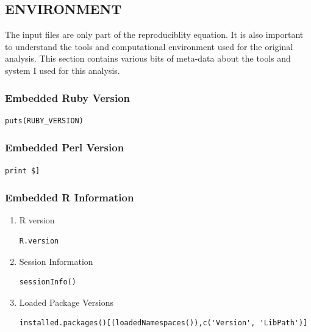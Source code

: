 \documentclass[11pt]{article}
\begin{document}
\subsection{ENVIRONMENT}
\label{sec-9-2}

The input files are only part of the reproduciblity equation.  It is also important to understand the tools and computational environment used for the
original analysis.  This section contains various bits of meta-data about the tools and system I used for this analysis.

\subsubsection{Embedded Ruby Version}
\label{sec-9-2-1}

\begin{verbatim}
puts(RUBY_VERSION)
\end{verbatim}

\subsubsection{Embedded Perl Version}
\label{sec-9-2-2}

\begin{verbatim}
print $]
\end{verbatim}

\subsubsection{Embedded R Information}
\label{sec-9-2-3}

\begin{enumerate}
\item R version
\label{sec-9-2-3-1}

\begin{verbatim}
R.version
\end{verbatim}

\item Session Information
\label{sec-9-2-3-2}

\begin{verbatim}
sessionInfo()
\end{verbatim}

\item Loaded Package Versions
\label{sec-9-2-3-3}

\begin{verbatim}
installed.packages()[(loadedNamespaces()),c('Version', 'LibPath')]
\end{verbatim}
\end{enumerate}
\end{document}
